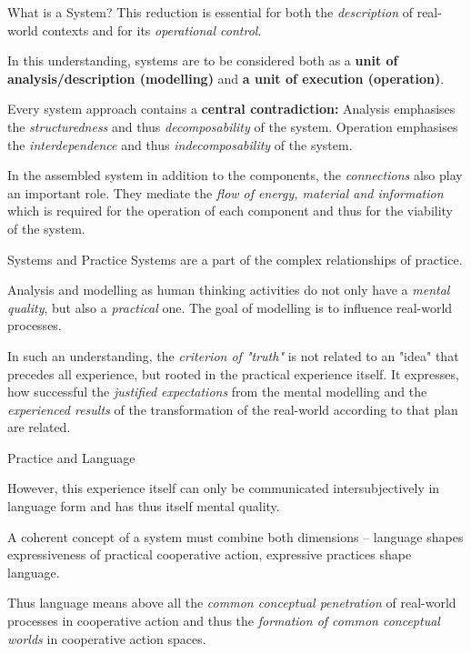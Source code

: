 \documentclass{beamer}
\begin{document}
\begin{frame}{What is a System?}
This reduction is essential for both the \emph{description} of real-world
contexts and for its \emph{operational control}.

In this understanding, systems are to be considered both as a \textbf{unit of
  analysis/description (modelling)} and \textbf{a unit of execution
  (operation)}.

Every system approach contains a \textbf{central contradiction:} Analysis
emphasises the \emph{structuredness} and thus \emph{decomposability} of the
system. Operation emphasises the \emph{interdependence} and thus
\emph{indecomposability} of the system.

In the assembled system in addition to the components, the \emph{connections}
also play an important role.  They mediate the \emph{flow of energy, material
  and information} which is required for the operation of each component and
thus for the viability of the system.
\end{frame}

\begin{frame}{Systems and Practice}
Systems are a part of the complex relationships of practice.

Analysis and modelling as human thinking activities do not only have a
\emph{mental quality}, but also a \emph{practical} one. The goal of modelling
is to influence real-world processes.

In such an understanding, the \emph{criterion of "truth"} is not related to an
"idea" that precedes all experience, but rooted in the practical experience
itself.  It expresses, how successful the \emph{justified expectations} from
the mental modelling and the \emph{experienced results} of the transformation
of the real-world according to that plan are related.
\end{frame}

\begin{frame}{Practice and Language}

However, this experience itself can only be communicated intersubjectively in
language form and has thus itself mental quality.

A coherent concept of a system must combine both dimensions -- language shapes
expressiveness of practical cooperative action, expressive practices shape
language.

Thus language means above all the \emph{common conceptual penetration} of
real-world processes in cooperative action and thus the \emph{formation of
  common conceptual worlds} in cooperative action spaces.

\end{frame}
\end{document}
